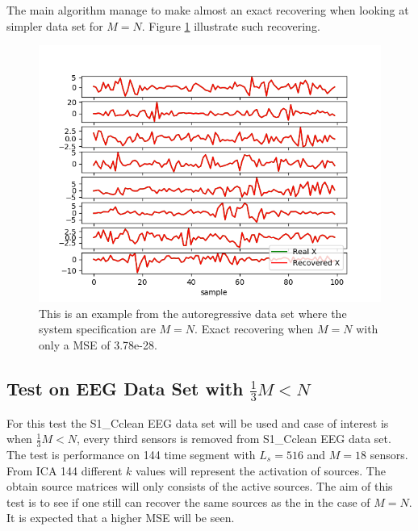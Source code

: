 The main algorithm manage to make almost an exact recovering when looking at simpler data set for $M=N$. Figure \ref{fig:M=N_test} illustrate such recovering.
\begin{figure}[H]
    \centering
	\includegraphics[scale=0.5]{figures/ch_7/M=N_test.png}
	\caption{This is an example from the autoregressive data set where the system specification are $M=N$. Exact recovering when $M=N$ with only a MSE of 3.78e-28.}
	\label{fig:M=N_test}
\end{figure}



\subsection{Test on EEG Data Set with $\frac{1}{3} M<N$}
For this test the S1\_Cclean EEG data set will be used and case of interest is when $\frac{1}{3} M < N$, every third sensors is removed from S1\_Cclean EEG data set. The test is performance on 144 time segment with $L_s = 516$ and $M = 18$ sensors. From ICA 144 different $k$ values will represent the activation of sources. The obtain source matrices will only consists of the active sources.
The aim of this test is to see if one still can recover the same sources as the in the case of $M=N$. It is expected that a higher MSE will be seen.

